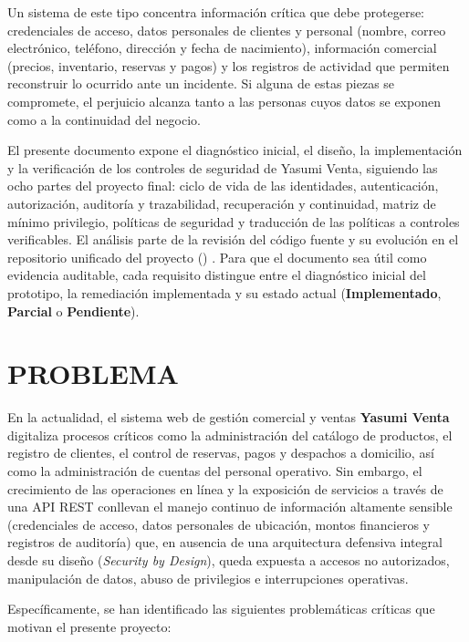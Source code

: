 \documentclass[12pt,letterpaper]{article}
\newcommand{\Si}{\textcolor{green!40!black}{\textbf{Implementado}}}
\newcommand{\Pa}{\textcolor{orange!80!black}{\textbf{Parcial}}}
\newcommand{\No}{\textcolor{red!70!black}{\textbf{Pendiente}}}
\newcommand{\cod}[1]{\path{#1}}
\begin{document}
Un sistema de este tipo concentra información crítica que debe protegerse: credenciales de acceso, datos personales de clientes y personal (nombre, correo electrónico, teléfono, dirección y fecha de nacimiento), información comercial (precios, inventario, reservas y pagos) y los registros de actividad que permiten reconstruir lo ocurrido ante un incidente. Si alguna de estas piezas se compromete, el perjuicio alcanza tanto a las personas cuyos datos se exponen como a la continuidad del negocio.

El presente documento expone el diagnóstico inicial, el diseño, la implementación y la verificación de los controles de seguridad de Yasumi Venta, siguiendo las ocho partes del proyecto final: ciclo de vida de las identidades, autenticación, autorización, auditoría y trazabilidad, recuperación y continuidad, matriz de mínimo privilegio, políticas de seguridad y traducción de las políticas a controles verificables. El análisis parte de la revisión del código fuente y su evolución en el repositorio unificado del proyecto (\cod{MigXploit/Sistema-ventas}) \cite{repos}. Para que el documento sea útil como evidencia auditable, cada requisito distingue entre el diagnóstico inicial del prototipo, la remediación implementada y su estado actual (\Si{}, \Pa{} o \No{}).

\section{PROBLEMA}

En la actualidad, el sistema web de gestión comercial y ventas \textbf{Yasumi Venta} digitaliza procesos críticos como la administración del catálogo de productos, el registro de clientes, el control de reservas, pagos y despachos a domicilio, así como la administración de cuentas del personal operativo. Sin embargo, el crecimiento de las operaciones en línea y la exposición de servicios a través de una API REST conllevan el manejo continuo de información altamente sensible (credenciales de acceso, datos personales de ubicación, montos financieros y registros de auditoría) que, en ausencia de una arquitectura defensiva integral desde su diseño (\emph{Security by Design}), queda expuesta a accesos no autorizados, manipulación de datos, abuso de privilegios e interrupciones operativas.

Específicamente, se han identificado las siguientes problemáticas críticas que motivan el presente proyecto:
\end{document}

